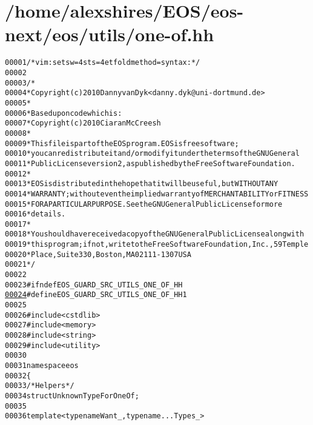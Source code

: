 \hypertarget{one-of_8hh_source}{
\section{/home/alexshires/EOS/eos-\/next/eos/utils/one-\/of.hh}
}


\begin{footnotesize}\begin{alltt}
00001 \textcolor{comment}{/* vim: set sw=4 sts=4 et foldmethod=syntax : */}
00002 
00003 \textcolor{comment}{/*}
00004 \textcolor{comment}{ * Copyright (c) 2010 Danny van Dyk <danny.dyk@uni-dortmund.de>}
00005 \textcolor{comment}{ *}
00006 \textcolor{comment}{ * Based upon code which is:}
00007 \textcolor{comment}{ *     Copyright (c) 2010 Ciaran McCreesh}
00008 \textcolor{comment}{ *}
00009 \textcolor{comment}{ * This file is part of the EOS program. EOS is free software;}
00010 \textcolor{comment}{ * you can redistribute it and/or modify it under the terms of the GNU General}
00011 \textcolor{comment}{ * Public License version 2, as published by the Free Software Foundation.}
00012 \textcolor{comment}{ *}
00013 \textcolor{comment}{ * EOS is distributed in the hope that it will be useful, but WITHOUT ANY}
00014 \textcolor{comment}{ * WARRANTY; without even the implied warranty of MERCHANTABILITY or FITNESS}
00015 \textcolor{comment}{ * FOR A PARTICULAR PURPOSE.  See the GNU General Public License for more}
00016 \textcolor{comment}{ * details.}
00017 \textcolor{comment}{ *}
00018 \textcolor{comment}{ * You should have received a copy of the GNU General Public License along with}
00019 \textcolor{comment}{ * this program; if not, write to the Free Software Foundation, Inc., 59 Temple}
00020 \textcolor{comment}{ * Place, Suite 330, Boston, MA  02111-1307  USA}
00021 \textcolor{comment}{ */}
00022 
00023 \textcolor{preprocessor}{#ifndef EOS\_GUARD\_SRC\_UTILS\_ONE\_OF\_HH}
\hypertarget{one-of_8hh_source_l00024}{}\hyperlink{one-of_8hh_a10085f9ae6e432b67c7cf4d66bb54174}{00024} \textcolor{preprocessor}{}\textcolor{preprocessor}{#define EOS\_GUARD\_SRC\_UTILS\_ONE\_OF\_HH 1}
00025 \textcolor{preprocessor}{}
00026 \textcolor{preprocessor}{#include <cstdlib>}
00027 \textcolor{preprocessor}{#include <memory>}
00028 \textcolor{preprocessor}{#include <string>}
00029 \textcolor{preprocessor}{#include <utility>}
00030 
00031 \textcolor{keyword}{namespace }eos
00032 \{
00033     \textcolor{comment}{/* Helpers */}
00034     \textcolor{keyword}{struct }UnknownTypeForOneOf;
00035 
00036     \textcolor{keyword}{template} <\textcolor{keyword}{typename} Want\_, \textcolor{keyword}{typename} ... Types\_>

\end{alltt}
\end{footnotesize}
